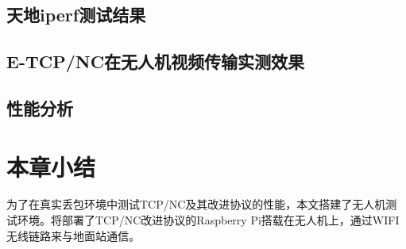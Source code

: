 \subsection{天地iperf测试结果}
\subsection{E-TCP/NC在无人机视频传输实测效果}
\subsection{性能分析}
\section{本章小结}
为了在真实丢包环境中测试TCP/NC及其改进协议的性能，本文搭建了无人机测试环境。将部署了TCP/NC改进协议的Raspberry Pi搭载在无人机上，通过WIFI无线链路来与地面站通信。 